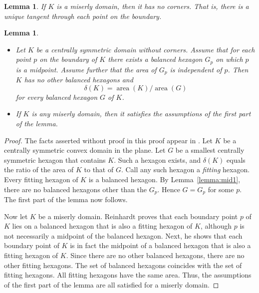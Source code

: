 \documentclass[11pt]{amsart}
\newtheorem{lemma}[equation]{Lemma}
\def\op#1{{\operatorname{#1}}}
\def\deltalat{\mathbb\delta}  %
\def\aa{{\op{area}}}
\begin{document}
\begin{lemma}\label{lemma:221} 
  If $K$ is a miserly domain, then it has no corners.  That is, there
  is a unique tangent through each point on the boundary.
  \cite[p.221]{Reinhardt:1934}
\end{lemma}

\begin{lemma}\label{lemma:mid-min} %
\begin{itemize}
\item Let $K$ be a centrally symmetric domain without corners.  Assume
  that for each point $p$ on the boundary of $K$ there exists a
  balanced hexagon $G_p$ on which $p$ is a midpoint.  Assume further
  that the area of $G_p$ is independent of $p$.  Then $K$ has no
  other balanced hexagons and
\begin{equation}\label{eqn:density}
\deltalat(K) = \aa(K)/\aa(G)
\end{equation}
for every balanced hexagon $G$ of $K$.
\item If $K$ is any miserly domain, then it satisfies the assumptions
  of the first part of the lemma.
\end{itemize}
\end{lemma}
%
\begin{proof} The facts asserted without proof in this proof appear in
  \cite[pp.219--222]{Reinhardt:1934}.  Let $K$ be a centrally symmetric convex
  domain in the plane.  Let $G$ be a smallest centrally symmetric
  hexagon that contains $K$.  Such a hexagon exists, and
  $\deltalat(K)$ equals the ratio of the area of $K$ to that of
  $G$. %
  Call any such hexagon a {\it fitting} hexagon.  Every fitting
  hexagon of $K$ is a balanced hexagon. %
  By Lemma~\ref{lemma:mid1}, there are no balanced hexagons other than
  the $G_p$.  Hence $G=G_p$ for some $p$.  The first part of the lemma
  now follows.

  Now let $K$ be a miserly domain.  Reinhardt proves that each
  boundary point $p$ of $K$ lies on a balanced hexagon that is also a
  fitting hexagon of $K$, although $p$ is not necessarily a midpoint
  of the balanced hexagon.  %
  Next, he shows that each boundary point of $K$ is in fact the
  midpoint of a balanced hexagon that is also a fitting hexagon of
  $K$. %
  Since there are no other balanced hexagons, there are no other
  fitting hexagons.  The set of balanced hexagons coincides with the
  set of fitting hexagons.  All fitting hexagons have the same area.
  Thus, the assumptions of the first part of the lemma are all
  satisfied for a miserly domain.
\end{proof}
\end{document}
